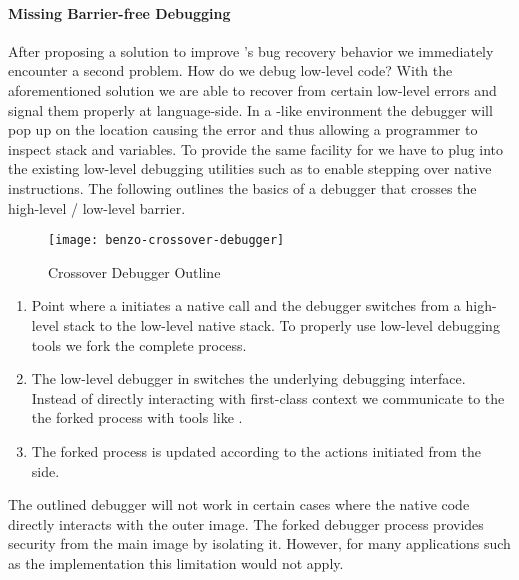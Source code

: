 \paragraph{Missing Barrier-free Debugging}
After proposing a solution to improve \B's bug recovery behavior we immediately encounter a second problem.
How do we debug low-level code?
With the aforementioned solution we are able to recover from certain low-level errors and signal them properly at language-side.
In a \ST-like environment the debugger will pop up on the location causing the error and thus allowing a programmer to inspect stack and variables.
To provide the same facility for \B we have to plug into the existing low-level debugging utilities such as  to enable stepping over native instructions.
The following  outlines the basics of a debugger that crosses the high-level / low-level barrier.
%
\begin{figure}[h]
	\centering
	\texttt{[image: benzo-crossover-debugger]}
	\caption{\B Crossover Debugger Outline}
\end{figure}
%
\begin{enumerate}
	\item Point where a \B initiates a native call and the debugger switches from a high-level \PH stack to the low-level native stack.
To properly use low-level debugging tools we fork the complete \VM process.
	\item The low-level debugger in \PH switches the underlying debugging interface.
Instead of directly interacting with first-class \PH context we communicate to the the forked process with tools like .
	\item The forked process is updated according to the actions initiated from the \PH side.
\end{enumerate}

\noindent The outlined debugger will not work in certain cases where the native code directly interacts with the outer image.
The forked debugger process provides security from the main \PH image by isolating it.
However, for many \B applications such as the \FFI implementation this limitation would not apply.


\newpage
